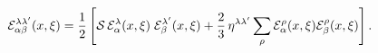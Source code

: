 \begin{equation}\label{eq:tensor1}
{\cal E}_{\alpha\beta}^{\lambda\lambda'}(x,\xi)= \frac{1}{2}\left[
{\cal S}\,{\cal E}_{\alpha}^{\lambda}(x,\xi)\; {\cal
E}_{\beta}^{\lambda'}(x,\xi)+\frac{2}{3}\, \eta^{\lambda\lambda'}
\sum_{\rho}{\cal E }^{\rho}_{\alpha}(x,\xi){\cal E
}^{\rho}_{\beta}(x,\xi) \right].
\end{equation}

